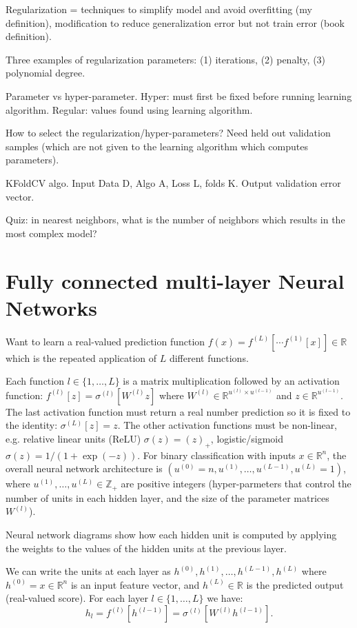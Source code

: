 \documentclass{article}
\begin{document}
Regularization = techniques to simplify model and avoid overfitting
(my definition), modification to reduce generalization error but not
train error (book definition).

Three examples of regularization parameters: (1) iterations, (2)
penalty, (3) polynomial degree.

Parameter vs hyper-parameter. Hyper: must first be fixed before
running learning algorithm. Regular: values found using learning
algorithm.

How to select the regularization/hyper-parameters? Need held out
validation samples (which are not given to the learning algorithm
which computes parameters).

KFoldCV algo. Input Data D, Algo A, Loss L, folds K. Output validation
error vector.

Quiz: in nearest neighbors, what is the number of neighbors which
results in the most complex model?

\section{Fully connected multi-layer Neural Networks}

Want to learn a real-valued prediction function
$f(x)=f^{(L)}[\cdots f^{(1)}[x] ]\in\mathbb R$ which is the repeated
application of $L$ different functions.

Each function $l\in\{1,\dots, L\}$ is a matrix multiplication followed
by an activation function: $f^{(l)}[z] = \sigma^{(l)}[ W^{(l)} z ]$
where $W^{(l)}\in\mathbb R^{u^{(l)}\times u^{(l-1)}}$ and
$z\in\mathbb R^{u^{(l-1)}}$. The last activation function must return
a real number prediction so it is fixed to the identity:
$\sigma^{(L)}[z]=z$. The other activation functions must be
non-linear, e.g. relative linear units (ReLU) $\sigma(z)=(z)_+$,
logistic/sigmoid $\sigma(z)=1/(1+\exp(-z))$. For binary classification
with inputs $x\in\mathbb R^n$, the overall neural network architecture
is $(u^{(0)}=n, u^{(1)}, \dots, u^{(L-1)}, u^{(L)}=1)$, where
$u^{(1)},\dots, u^{(L)}\in\mathbb Z_+$ are positive integers
(hyper-parmeters that control the number of units in each hidden
layer, and the size of the parameter matrices $W^{(l)}$).

Neural network diagrams show how each hidden unit is computed by
applying the weights to the values of the hidden units at the previous
layer.

We can write the units at each layer as
$h^{(0)},h^{(1)},\dots, h^{(L-1)}, h^{(L)}$ where
$h^{(0)}=x\in\mathbb R^n$ is an input feature vector, and
$h^{(L)}\in\mathbb R$ is the predicted output (real-valued score). For
each layer $l\in \{1, \dots, L\}$ we have:
\begin{equation}
  \label{eq:h_l}
  h_l = f^{(l)}\left[h^{(l-1)}\right] =
  \sigma^{(l)}\left[ W^{(l)} h^{(l-1)} \right].
\end{equation}
\end{document}
